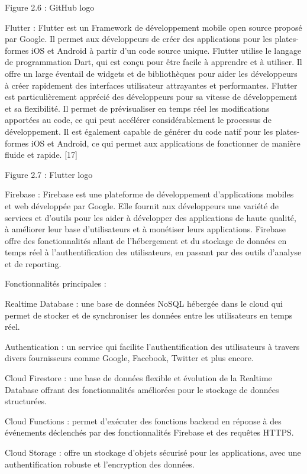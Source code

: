 \documentclass{article}
\begin{document}
Figure 2.6 : GitHub logo

Flutter : Flutter est un Framework de développement mobile open source proposé par Google. Il permet aux développeurs de créer des applications pour les plates-formes iOS et Android à partir d’un code source unique. Flutter utilise le langage de programmation Dart, qui est conçu pour être facile à apprendre et à utiliser. Il offre un large éventail de widgets et de bibliothèques pour aider les développeurs à créer rapidement des interfaces utilisateur attrayantes et performantes. Flutter est particulièrement apprécié des développeurs pour sa vitesse de développement et sa flexibilité. Il permet de prévisualiser en temps réel les modifications apportées au code, ce qui peut accélérer considérablement le processus de développement. Il est également capable de générer du code natif pour les plates-formes iOS et Android, ce qui permet aux applications de fonctionner de manière fluide et rapide. [17]

Figure 2.7 : Flutter logo

Firebase : Firebase est une plateforme de développement d’applications mobiles et web développée par Google. Elle fournit aux développeurs une variété de services et d’outils pour les aider à développer des applications de haute qualité, à améliorer leur base d’utilisateurs et à monétiser leurs applications. Firebase offre des fonctionnalités allant de l’hébergement et du stockage de données en temps réel à l’authentification des utilisateurs, en passant par des outils d’analyse et de reporting.

Fonctionnalités principales :

Realtime Database : une base de données NoSQL hébergée dans le cloud qui permet de stocker et de synchroniser les données entre les utilisateurs en temps réel.

Authentication : un service qui facilite l’authentification des utilisateurs à travers divers fournisseurs comme Google, Facebook, Twitter et plus encore.

Cloud Firestore : une base de données flexible et évolution de la Realtime Database offrant des fonctionnalités améliorées pour le stockage de données structurées.

Cloud Functions : permet d’exécuter des fonctions backend en réponse à des événements déclenchés par des fonctionnalités Firebase et des requêtes HTTPS.

Cloud Storage : offre un stockage d’objets sécurisé pour les applications, avec une authentification robuste et l’encryption des données.
\end{document}
